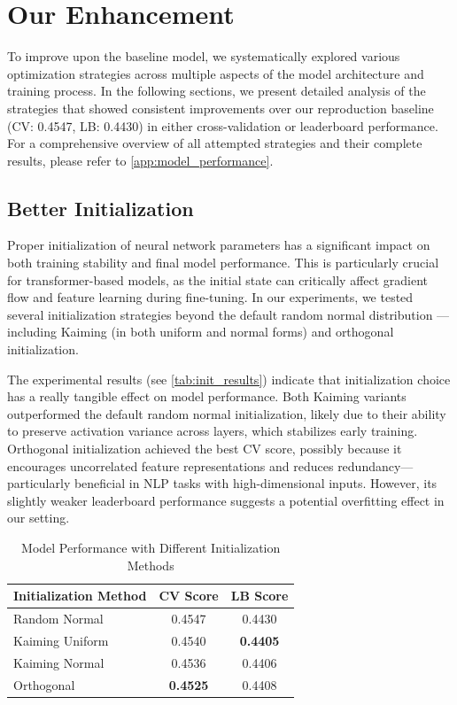 \documentclass[12pt]{article}
\begin{document}
\section{Our Enhancement}
To improve upon the baseline model, we systematically explored various optimization strategies across multiple aspects of the model architecture and training process. In the following sections, we present detailed analysis of the strategies that showed consistent improvements over our reproduction baseline (CV: 0.4547, LB: 0.4430) in either cross-validation or leaderboard performance. For a comprehensive overview of all attempted strategies and their complete results, please refer to \autoref{app:model_performance}.

\subsection{Better Initialization}
Proper initialization of neural network parameters has a significant impact on both training stability and final model performance. This is particularly crucial for transformer-based models, as the initial state can critically affect gradient flow and feature learning during fine-tuning. In our experiments, we tested several initialization strategies beyond the default random normal distribution — including Kaiming (in both uniform and normal forms) and orthogonal initialization. 

The experimental results (see \autoref{tab:init_results}) indicate that initialization choice has a really tangible effect on model performance. Both Kaiming variants outperformed the default random normal initialization, likely due to their ability to preserve activation variance across layers, which stabilizes early training. Orthogonal initialization achieved the best CV score, possibly because it encourages uncorrelated feature representations and reduces redundancy—particularly beneficial in NLP tasks with high-dimensional inputs. However, its slightly weaker leaderboard performance suggests a potential overfitting effect in our setting.

\begin{table}[H]
\centering
\caption{Model Performance with Different Initialization Methods}
\label{tab:init_results}
\begin{tabular}{lcc}
\hline
\textbf{Initialization Method} & \textbf{CV Score} & \textbf{LB Score} \\
\hline
Random Normal & 0.4547 & 0.4430 \\
Kaiming Uniform & 0.4540 & \textbf{0.4405} \\
Kaiming Normal & 0.4536 & 0.4406 \\
Orthogonal & \textbf{0.4525} & 0.4408 \\
\hline
\end{tabular}
\end{table}
\end{document}
